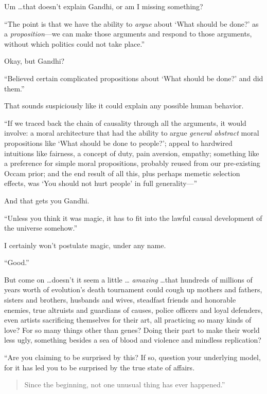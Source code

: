 {
 Um \ldots that doesn't explain Gandhi, or am I
missing something?}

{
 ``The point is that we have the ability to
\textit{argue} about `What should be
done?' as a \textit{proposition}{}---we can make those
arguments and respond to those arguments, without which politics could
not take place.''}

{
 Okay, but Gandhi?}

{
 ``Believed certain complicated propositions about
`What should be done?' and did
them.''}

{
 That sounds suspiciously like it could explain any possible human
behavior.}

{
 ``If we traced back the chain of causality
through all the arguments, it would involve: a moral architecture that
had the ability to argue \textit{general abstract} moral propositions
like `What should be done to people?';
appeal to hardwired intuitions like fairness, a concept of duty, pain
aversion, empathy; something like a preference for simple moral
propositions, probably reused from our pre-existing Occam prior; and
the end result of all this, plus perhaps memetic selection effects, was
`You should not hurt people' in full
generality---''}

{
 And that gets you Gandhi.}

{
 ``Unless you think it was magic, it has to fit
into the lawful causal development of the universe
somehow.''}

{
 I certainly won't postulate magic, under any
name.}

{
 ``Good.''}

{
 But come on \ldots doesn't it seem a little \ldots
\textit{amazing} \ldots that hundreds of millions of years worth of
evolution's death tournament could cough up mothers and
fathers, sisters and brothers, husbands and wives, steadfast friends
and honorable enemies, true altruists and guardians of causes, police
officers and loyal defenders, even artists sacrificing themselves for
their art, all practicing so many kinds of love? For so many things
other than genes? Doing their part to make their world less ugly,
something besides a sea of blood and violence and mindless
replication?}

{
 ``Are you claiming to be surprised by this? If
so, question your underlying model, for it has led you to be surprised
by the true state of affairs.}

\begin{quote}
{
 Since the beginning,\newline
 not one unusual thing\newline
 has ever happened.''}
\end{quote}

